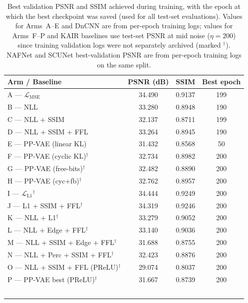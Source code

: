 \documentclass[12pt, a4paper, twoside, openright]{book}
\begin{document}
\begin{table}[htbp]
\centering
\small
\caption[Final training metrics per ablation arm]{Best validation PSNR and SSIM achieved during training, with the epoch at which the best checkpoint was saved (used for all test-set evaluations). Values for Arms~A--E and DnCNN are from per-epoch training logs; values for Arms~F--P and KAIR baselines use test-set PSNR at mid noise ($\eta=200$) since training validation logs were not separately archived (marked $^\dagger$). NAFNet and SCUNet best-validation PSNR are from per-epoch training logs on the same split.}
\label{tab:results:training}
\begin{tabular}{lccc}
\toprule
\textbf{Arm / Baseline} & \textbf{PSNR (dB)} & \textbf{SSIM} & \textbf{Best epoch} \\
\midrule
A — $\mathcal{L}_{\mathrm{MSE}}$        & 34.490 & 0.9137 & 199 \\
B — NLL                                  & 33.280 & 0.8948 & 190 \\
C — NLL + SSIM                           & 32.137 & 0.8711 & 199 \\
D — NLL + SSIM + FFL                     & 33.264 & 0.8945 & 190 \\
E — PP-VAE (linear KL)                   & 31.432 & 0.8568 & 50  \\
\midrule
F — PP-VAE (cyclic KL)$^\dagger$          & 32.734 & 0.8982 & 200 \\
G — PP-VAE (free-bits)$^\dagger$          & 32.482 & 0.8890 & 200 \\
H — PP-VAE (cyc+fb)$^\dagger$             & 32.762 & 0.8957 & 200 \\
I — $\mathcal{L}_{\mathrm{L1}}$$^\dagger$ & 34.444 & 0.9249 & 200 \\
J — L1 + SSIM + FFL$^\dagger$             & 34.319 & 0.9246 & 200 \\
K — NLL + L1$^\dagger$                    & 33.279 & 0.9052 & 200 \\
L — NLL + Edge + FFL$^\dagger$            & 33.140 & 0.9036 & 200 \\
M — NLL + SSIM + Edge + FFL$^\dagger$     & 31.688 & 0.8755 & 200 \\
N — NLL + Perc + SSIM + FFL$^\dagger$     & 32.423 & 0.8876 & 200 \\
O — NLL + SSIM + FFL (PReLU)$^\dagger$    & 29.074 & 0.8037 & 200 \\
P — PP-VAE best (PReLU)$^\dagger$          & 31.667 & 0.8739 & 200 \\
$$
\end{tabular}
\end{table}
\end{document}
